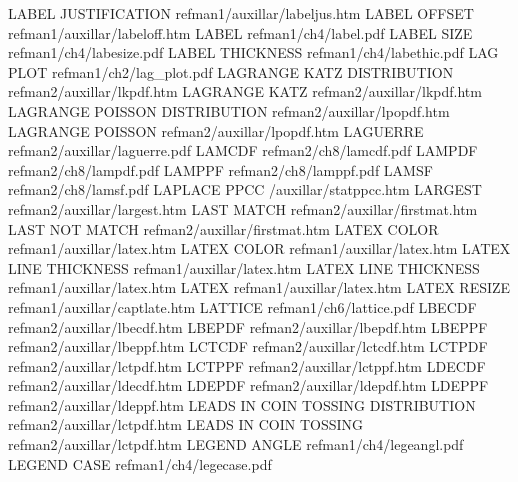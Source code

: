 LABEL JUSTIFICATION                     refman1/auxillar/labeljus.htm
LABEL OFFSET                            refman1/auxillar/labeloff.htm
LABEL                                   refman1/ch4/label.pdf
LABEL SIZE                              refman1/ch4/labesize.pdf
LABEL THICKNESS                         refman1/ch4/labethic.pdf
LAG PLOT                                refman1/ch2/lag_plot.pdf
LAGRANGE KATZ DISTRIBUTION              refman2/auxillar/lkpdf.htm
LAGRANGE KATZ                           refman2/auxillar/lkpdf.htm
LAGRANGE POISSON DISTRIBUTION           refman2/auxillar/lpopdf.htm
LAGRANGE POISSON                        refman2/auxillar/lpopdf.htm
LAGUERRE                                refman2/auxillar/laguerre.pdf
LAMCDF                                  refman2/ch8/lamcdf.pdf
LAMPDF                                  refman2/ch8/lampdf.pdf
LAMPPF                                  refman2/ch8/lamppf.pdf
LAMSF                                   refman2/ch8/lamsf.pdf
LAPLACE PPCC                            /auxillar/statppcc.htm
LARGEST                                 refman2/auxillar/largest.htm
LAST MATCH                              refman2/auxillar/firstmat.htm
LAST NOT MATCH                          refman2/auxillar/firstmat.htm
LATEX COLOR                             refman1/auxillar/latex.htm
LATEX COLOR                             refman1/auxillar/latex.htm
LATEX LINE THICKNESS                    refman1/auxillar/latex.htm
LATEX LINE THICKNESS                    refman1/auxillar/latex.htm
LATEX                                   refman1/auxillar/latex.htm
LATEX RESIZE                            refman1/auxillar/captlate.htm
LATTICE                                 refman1/ch6/lattice.pdf
LBECDF                                  refman2/auxillar/lbecdf.htm
LBEPDF                                  refman2/auxillar/lbepdf.htm
LBEPPF                                  refman2/auxillar/lbeppf.htm
LCTCDF                                  refman2/auxillar/lctcdf.htm
LCTPDF                                  refman2/auxillar/lctpdf.htm
LCTPPF                                  refman2/auxillar/lctppf.htm
LDECDF                                  refman2/auxillar/ldecdf.htm
LDEPDF                                  refman2/auxillar/ldepdf.htm
LDEPPF                                  refman2/auxillar/ldeppf.htm
LEADS IN COIN TOSSING DISTRIBUTION      refman2/auxillar/lctpdf.htm
LEADS IN COIN TOSSING                   refman2/auxillar/lctpdf.htm
LEGEND ANGLE                            refman1/ch4/legeangl.pdf
LEGEND CASE                             refman1/ch4/legecase.pdf
